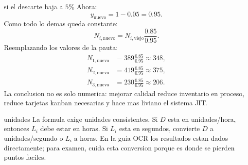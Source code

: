 \begin{solucion}{si el descarte baja a $5\%$}
Ahora:
\[
  y_{\text{nuevo}}=1-0.05=0.95.
\]
Como todo lo demas queda constante:
\[
  N_{i,\text{nuevo}}
  =
  N_{i,\text{viejo}}\frac{0.85}{0.95}.
\]
Reemplazando los valores de la pauta:
\[
\begin{aligned}
N_{1,\text{nuevo}}&=389\frac{0.85}{0.95}\approx 348,\\
N_{2,\text{nuevo}}&=419\frac{0.85}{0.95}\approx 375,\\
N_{3,\text{nuevo}}&=230\frac{0.85}{0.95}\approx 206.
\end{aligned}
\]
La conclusion no es solo numerica: mejorar calidad reduce inventario en proceso, reduce tarjetas kanban necesarias y hace mas liviano el sistema JIT.
\end{solucion}

\begin{alerta}{unidades}
La formula exige unidades consistentes. Si $D$ esta en unidades/hora, entonces $L_i$ debe estar en horas. Si $L_i$ esta en segundos, convierte $D$ a unidades/segundo o $L_i$ a horas. En la guia OCR los resultados estan dados directamente; para examen, cuida esta conversion porque es donde se pierden puntos faciles.
\end{alerta}
